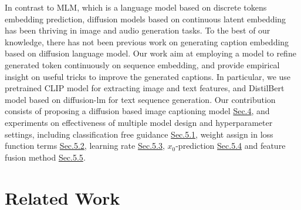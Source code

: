 \documentclass{article}
\begin{document}
In contrast to MLM, which is a language model based on discrete tokens embedding prediction, diffusion models based on continuous latent embedding has been thriving in image and audio generation tasks\cite{dalle2, https://doi.org/10.48550/arxiv.2205.11487,glide,DBLP:journals/corr/abs-2105-06337,https://doi.org/10.48550/arxiv.2207.09983}. To the best of our knowledge, there has not been previous work on generating caption embedding based on diffusion language model. Our work aim at employing a model to refine generated token continuously on sequence embedding, and provide empirical insight on useful tricks to improve the generated captions. In particular, we use pretrained CLIP\cite{clip} model for extracting image and text features, and DistilBert\cite{distilbert} model based on diffusion-lm\cite{diffuselm} for text sequence generation. Our contribution consists of proposing a diffusion based image captioning model \hyperref[sec:CLIP-DiffuseLM]{Sec.4}, and experiments on effectiveness of multiple model design and hyperparameter settings, including classification free guidance \hyperref[sec:classification-free-exp]{Sec.5.1}, weight assign in loss function terms \hyperref[sec:lambda-exp]{Sec.5.2}, learning rate \hyperref[sec:lr-exp]{Sec.5.3}, $x_0$-prediction \hyperref[sec:x0-exp]{Sec.5.4} and feature fusion method \hyperref[sec:CLIP-DiffuseLM]{Sec.5.5}.

\section{Related Work}
\label{sec:headings}
\end{document}
